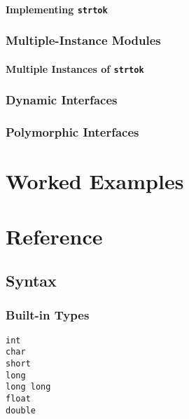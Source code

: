 \documentclass[a4paper,10pt]{report}
\newcommand{\kw}[1]{\texttt{#1}}
\begin{document}
\subsection{Implementing \kw{strtok}}

\section{Multiple-Instance Modules}

\subsection{Multiple Instances of \kw{strtok}}

\section{Dynamic Interfaces}

\section{Polymorphic Interfaces}

\part{Worked Examples}

\part{Reference}

\chapter{Syntax}

\section{Built-in Types}

\begin{description}
  \item[\kw{int}]
  \item[\kw{char}]
  \item[\kw{short}]
  \item[\kw{long}]
  \item[\kw{long long}]
  \item[\kw{float}]
  \item[\kw{double}]
\end{description}
\end{document}
